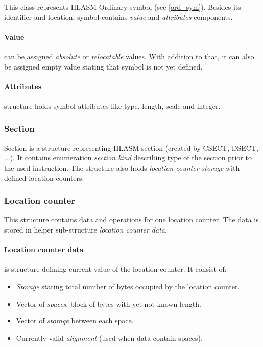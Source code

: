 This class represents HLASM Ordinary symbol (see \cref{ord_sym}). Besides its identifier and location, symbol contains \emph{value} and \emph{attributes} components.

\paragraph*{Value} can be assigned \emph{absolute} or \emph{relocatable} values. With addition to that, it can also be assigned empty value stating that symbol is not yet defined.

\paragraph*{Attributes} structure holds symbol attributes like type, length, scale and integer.

\subsubsection{Section}

Section is a structure representing HLASM section (created by CSECT, DSECT, ...). It contains enumeration \emph{section kind} describing type of the section prior to the used instruction. The structure also holds \emph{location counter storage} with defined location counters.

\subsubsection{Location counter}

This structure contains data and operations for one location counter. The data is stored in helper sub-structure \emph{location counter data}.

\paragraph*{Location counter data} is structure defining current value of the location counter. It consist of:
\begin{itemize}
	\item \emph{Storage} stating total number of bytes occupied by the location counter.
	\item Vector of \emph{spaces}, block of bytes with yet not known length.
	\item Vector of \emph{storage} between each space.
	\item Currently valid \emph{alignment} (used when data contain spaces).
\end{itemize}

